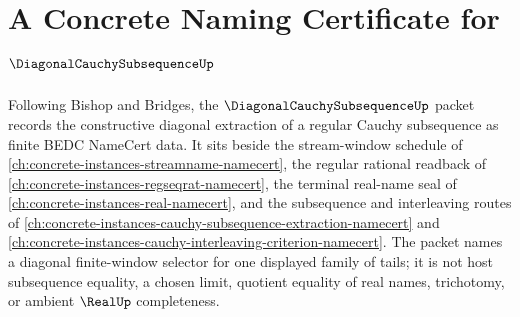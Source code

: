\chapter{A Concrete Naming Certificate for $\DiagonalCauchySubsequenceUp$}
\label{ch:concrete-instances-diagonal-cauchy-subsequence-namecert}

Following Bishop and Bridges, the $\DiagonalCauchySubsequenceUp$ packet records the constructive diagonal extraction of a regular Cauchy subsequence as finite BEDC NameCert data. It sits beside the stream-window schedule of \autoref{ch:concrete-instances-streamname-namecert}, the regular rational readback of \autoref{ch:concrete-instances-regseqrat-namecert}, the terminal real-name seal of \autoref{ch:concrete-instances-real-namecert}, and the subsequence and interleaving routes of \autoref{ch:concrete-instances-cauchy-subsequence-extraction-namecert} and \autoref{ch:concrete-instances-cauchy-interleaving-criterion-namecert}. The packet names a diagonal finite-window selector for one displayed family of tails; it is not host subsequence equality, a chosen limit, quotient equality of real names, trichotomy, or ambient $\RealUp$ completeness.

